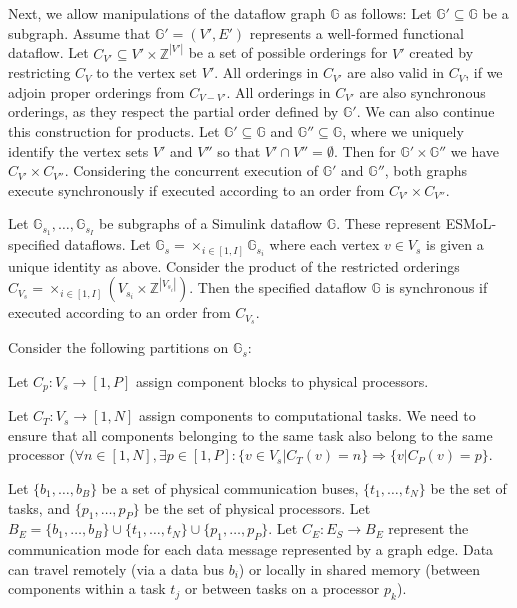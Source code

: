 Next, we allow manipulations of the dataflow graph $\mathbb{G}$ as follows:
Let $\mathbb{G}' \subseteq \mathbb{G}$ be a subgraph.  Assume that $\mathbb{G}'=(V',E')$ represents a well-formed functional dataflow.   Let $C_{V'} \subseteq V' \times \mathbb{Z}^{|V'|}$ be a set of possible orderings for $V'$ created by
restricting $C_V$ to the vertex set $V'$.  All orderings in $C_{V'}$ are also
valid in $C_V$, if we adjoin proper orderings from $C_{V-V'}$.  All orderings 
in $C_{V'}$ are also synchronous orderings, as they respect the partial order 
defined by $\mathbb{G}'$.  We can also
continue this construction for products.  Let $\mathbb{G}' \subseteq \mathbb{G}$ and $\mathbb{G}'' \subseteq \mathbb{G}$, where we uniquely identify the vertex
sets $V'$ and $V''$ so that $V' \cap V'' = \emptyset$.  Then for 
$\mathbb{G}' \times \mathbb{G}''$ we have $C_{V'} \times C_{V''}$.  
Considering the concurrent execution of $\mathbb{G}'$ and $\mathbb{G}''$, both
graphs execute synchronously if executed according to an order from
$C_{V'} \times C_{V''}$.

Let $\mathbb{G}_{s_1}, \ldots, \mathbb{G}_{s_I}$ be subgraphs of a Simulink dataflow $\mathbb{G}$.
These represent ESMoL-specified dataflows.  Let $\mathbb{G}_s = \times_{i \in [1,I]} \mathbb{G}_{s_i}$ where each vertex $v \in V_s$ is given a unique identity as above.
Consider the product of the restricted orderings $C_{V_s} = \times_{i \in [1,I]} (V_{s_i} \times \mathbb{Z}^{|V_{s_i}|})$.  Then the specified dataflow $\mathbb{G}$ is synchronous if executed according to an order from $C_{V_s}$.

Consider the following partitions on $\mathbb{G}_s$:

Let $C_p: V_s \rightarrow [1,P]$ assign component blocks to physical processors.

Let $C_T: V_s \rightarrow [1,N]$ assign components to computational tasks.  We need to ensure that all components belonging to the same task also belong to the same processor ($\forall n \in [1,N], \exists p \in [1,P] : \{v \in V_s | C_T(v)=n\} \Rightarrow \{v | C_P(v) = p\}$.

Let $\{b_1, \ldots, b_B\}$ be a set of physical communication buses, $\{t_1, \ldots, t_N\}$ be the set of tasks, and $\{p_1, \ldots, p_P\}$ be the set of 
physical processors.  Let $B_E =  \{b_1, \ldots, b_B\} \cup \{t_1, \ldots, t_N\} \cup \{p_1, \ldots, p_P\}$.  Let $C_E: E_S \rightarrow B_E$ represent the 
communication mode for each data message represented by a graph edge.  
Data can travel remotely (via a data bus $b_i$) or locally in shared memory 
(between components within a task $t_j$ or between tasks on a processor $p_k$).

